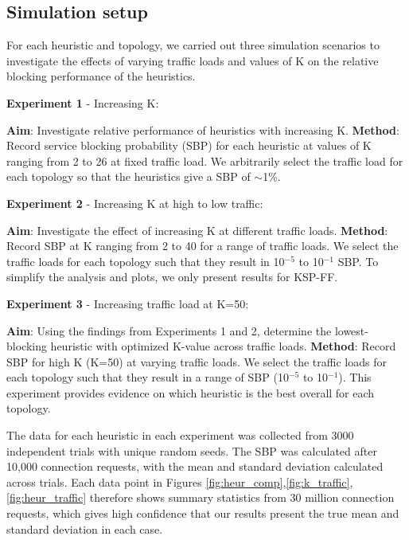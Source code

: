 \subsection{Simulation setup}

For each heuristic and topology, we carried out three simulation scenarios to investigate the effects of varying traffic loads and values of K on the relative blocking performance of the heuristics. 

\vspace{0.1cm}

\noindent \textbf{Experiment 1} - Increasing K:
\par \noindent \textbf{Aim}: Investigate relative performance of heuristics with increasing K. \textbf{Method}: Record service blocking probability (SBP) for each heuristic at values of K ranging from 2 to 26 at fixed traffic load. We arbitrarily select the traffic load for each topology so that the heuristics give a SBP of  $\sim$1\%.

\vspace{0.1cm}

\noindent \textbf{Experiment 2} - Increasing K at high to low traffic: 
\par \noindent \textbf{Aim}: Investigate the effect of increasing K at different traffic loads. \textbf{Method}: Record SBP at K ranging from 2 to 40 for a range of traffic loads. We select the traffic loads for each topology such that they result in 10$^{-5}$ to 10$^{-1}$ SBP. To simplify the analysis and plots, we only present results for KSP-FF.

\vspace{0.1cm}

\noindent \textbf{Experiment 3} - Increasing traffic load at K=50: 
\par \noindent \textbf{Aim}: Using the findings from Experiments 1 and 2, determine the lowest-blocking heuristic with optimized K-value across traffic loads. \textbf{Method}: Record SBP for high K (K=50) at varying traffic loads. We select the traffic loads for each topology such that they result in a range of SBP (10$^{-5}$ to 10$^{-1}$). This experiment provides evidence on which heuristic is the best overall for each topology.

\vspace{0.1cm}

The data for each heuristic in each experiment was collected from 3000 independent trials with unique random seeds. The SBP was calculated after 10,000 connection requests, with the mean and standard deviation calculated across trials. Each data point in Figures \ref{fig:heur_comp},\ref{fig:k_traffic},\ref{fig:heur_traffic} therefore shows summary statistics from 30 million connection requests, which gives high confidence that our results present the true mean and standard deviation in each case.

